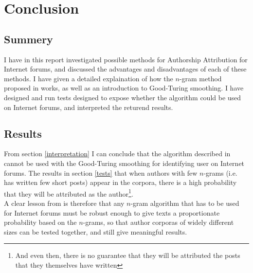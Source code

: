 

\section{Conclusion}
\label{conclusion}

\subsection{Summery}
I have in this report investigated possible methods for Authorship Attribution for Internet forums, and discussed the advantages and disadvantages of each of these methods. I have given a detailed explaination of how the $n$-gram method proposed in \cite{nr4} works, as well as an introduction to Good-Turing smoothing. I have designed and run tests designed to expose whether the algorithm could be used on Internet forums, and interpreted the returend results.  

\subsection{Results}
From section \ref{interpretation} I can conclude that the algorithm described in \cite{nr4} cannot be used with the Good-Turing smoothing for identifying user on Internet forums. The results in section \ref{tests} that when authors with few $n$-grams (i.e. has written few short posts) appear in the corpora, there is a high probability that they will be attributed as the author\footnote{And even then, there is no guarantee that they will be attributed the posts that they themselves have written}.\\

A clear lesson from \cite{nr4} is therefore that any $n$-gram algorithm that has to be used for Internet forums must be robust enough to give texts a proportionate probability based on the $n$-grams, so that author corporas of widely different sizes can be tested together, and still give meaningful results. 

